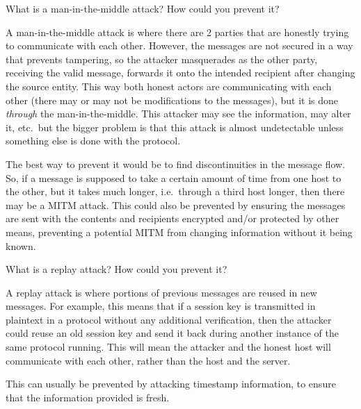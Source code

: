 \begin{questions}
\question{} What is a man-in-the-middle attack? How could you prevent it?
  \begin{solution}
    A man-in-the-middle attack is where there are 2 parties that are honestly trying to communicate with each other.
    However, the messages are not secured in a way that prevents tampering, so the attacker masquerades as the other party, receiving the valid message, forwards it onto the intended recipient after changing the source entity.
    This way both honest actors are communicating with each other (there may or may not be modifications to the messages), but it is done \emph{through} the man-in-the-middle.
    This attacker may see the information, may alter it, etc.\ but the bigger problem is that this attack is almost undetectable unless something else is done with the protocol.

    The best way to prevent it would be to find discontinuities in the message flow.
    So, if a message is supposed to take a certain amount of time from one host to the other, but it takes much longer, i.e.\ through a third host longer, then there may be a MITM attack.
    This could also be prevented by ensuring the messages are sent with the contents and recipients encrypted and/or protected by other means, preventing a potential MITM from changing information without it being known.
  \end{solution}

\question{} What is a replay attack? How could you prevent it?
  \begin{solution}
    A replay attack is where portions of previous messages are reused in new messages.
    For example, this means that if a session key is transmitted in plaintext in a protocol without any additional verification, then the attacker could reuse an old session key and send it back during another instance of the same protocol running.
    This will mean the attacker and the honest host will communicate with each other, rather than the host and the server.

    This can usually be prevented by attacking timestamp information, to ensure that the information provided is fresh.
  \end{solution}


\end{questions}
